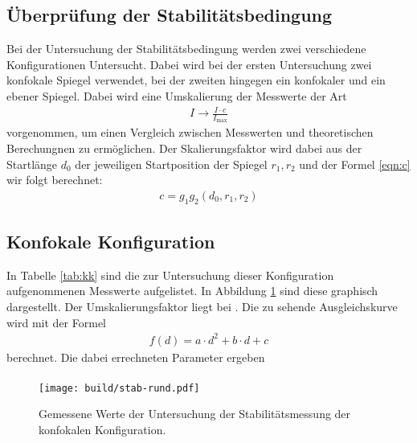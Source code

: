 \subsection{Überprüfung der Stabilitätsbedingung}
Bei der Untersuchung der Stabilitätsbedingung werden zwei verschiedene
Konfigurationen Untersucht. Dabei wird bei der ersten Untersuchung zwei
konfokale Spiegel verwendet, bei der zweiten hingegen ein konfokaler und
ein ebener Spiegel. Dabei wird eine Umskalierung der Messwerte der Art
\begin{align*}
  I \rightarrow \frac{I \cdot c}{I_\text{max}}
\end{align*}
vorgenommen, um einen Vergleich zwischen Messwerten und theoretischen
Berechungnen zu ermöglichen.
Der Skalierungsfaktor wird dabei aus der Startlänge $d_0$ der jeweiligen
Startposition der Spiegel $r_1, r_2$ und der Formel \ref{eqn:c} wir folgt
berechnet:
\begin{align*}
  c = g_1g_2(d_0,r_1,r_2)
\end{align*}

\subsection{Konfokale Konfiguration}
In Tabelle \ref{tab:kk} sind die zur Untersuchung dieser Konfiguration
aufgenommenen Messwerte aufgelistet. In Abbildung \ref{plt:kk} sind diese
graphisch dargestellt. Der Umskalierungsfaktor liegt bei $\si{}$. Die zu
sehende Ausgleichskurve wird mit der Formel
\begin{align*}
  f(d) = a\cdot d^2 + b\cdot d + c
\end{align*}
berechnet. Die dabei errechneten Parameter ergeben
\begin{align*}
\end{align*}

\begin{figure}[htb]
  \texttt{[image: build/stab-rund.pdf]}
  \caption{Gemessene Werte der Untersuchung der Stabilitätsmessung der konfokalen Konfiguration. }
  \label{plt:kk}
\end{figure}

%

